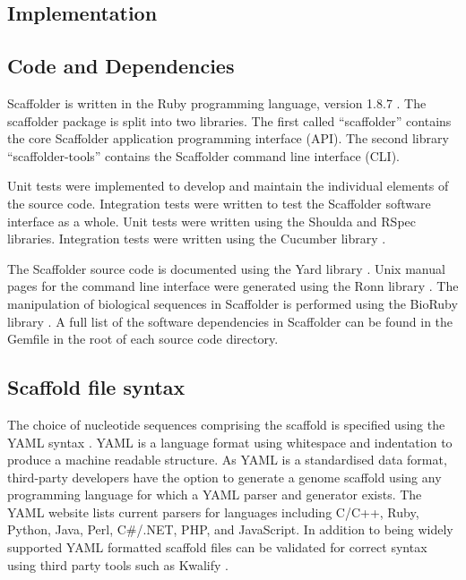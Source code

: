 \documentclass[10pt]{bmc_article}
\newenvironment{bmcformat}{\begin{raggedright}\baselineskip20pt\sloppy\setboolean{publ}{false}}{\end{raggedright}\baselineskip20pt\sloppy}
\begin{document}
\begin{bmcformat}
\section*{Implementation} %

\subsection*{Code and Dependencies} %

Scaffolder is written in the Ruby programming language, version 1.8.7
\cite{ruby-lang}. The scaffolder package is split into two libraries. The first
called ``scaffolder'' contains the core Scaffolder application programming
interface (API). The second library ``scaffolder-tools'' contains the
Scaffolder command line interface (CLI). \pb

Unit tests were implemented to develop and maintain the individual elements of
the source code.  Integration tests were written to test the Scaffolder
software interface as a whole. Unit tests were written using the Shoulda and
RSpec \cite{rspec} libraries.  Integration tests were written using the
Cucumber library \cite{rspec}. \pb

The Scaffolder source code is documented using the Yard library \cite{yard}.
Unix manual pages for the command line interface were generated using the Ronn
library \cite{ronn}. The manipulation of biological sequences in Scaffolder is
performed using the BioRuby library \cite{goto2010}. A full list of the
software dependencies in Scaffolder can be found in the Gemfile in the root of
each source code directory. \pb

\subsection*{Scaffold file syntax} %

The choice of nucleotide sequences comprising the scaffold is specified using
the YAML syntax \cite{yaml}. YAML is a language format using whitespace and
indentation to produce a machine readable structure. As YAML is a standardised
data format, third-party developers have the option to generate a genome
scaffold using any programming language for which a YAML parser and generator
exists. The YAML website lists current parsers for languages including C/C++,
Ruby, Python, Java, Perl, C\#/.NET, PHP, and JavaScript. In addition to being
widely supported YAML formatted scaffold files can be validated for correct
syntax using third party tools such as Kwalify \cite{kwalify}. \pb


\end{bmcformat}
\end{document}
